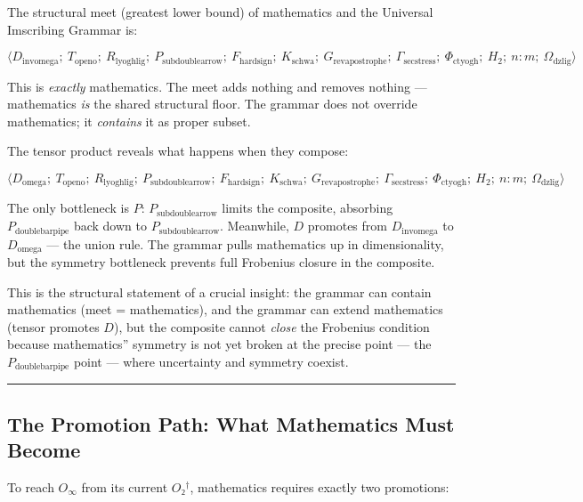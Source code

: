 \documentclass[12pt,a4paper]{article}
\begin{document}
The structural meet (greatest lower bound) of mathematics and the Universal Imscribing Grammar is:

\[\langle D_{\text{invomega}};\ T_{\text{openo}};\ R_{\text{lyoghlig}};\ P_{\text{subdoublearrow}};\ F_{\text{hardsign}};\ K_{\text{schwa}};\ G_{\text{revapostrophe}};\ \Gamma_{\text{secstress}};\ \Phi_{\text{ctyogh}};\ H_2;\ n{:}m;\ \Omega_{\text{dzlig}} \rangle\]

This is \emph{exactly} mathematics. The meet adds nothing and removes nothing --- mathematics \emph{is} the shared structural floor. The grammar does not override mathematics; it \emph{contains} it as proper subset.

The tensor product reveals what happens when they compose:

\[\langle D_{\text{omega}};\ T_{\text{openo}};\ R_{\text{lyoghlig}};\ P_{\text{subdoublearrow}};\ F_{\text{hardsign}};\ K_{\text{schwa}};\ G_{\text{revapostrophe}};\ \Gamma_{\text{secstress}};\ \Phi_{\text{ctyogh}};\ H_2;\ n{:}m;\ \Omega_{\text{dzlig}} \rangle\]

The only bottleneck is $P$: $P_{\text{subdoublearrow}}$ limits the composite, absorbing $P_{\text{doublebarpipe}}$ back down to $P_{\text{subdoublearrow}}$. Meanwhile, $D$ promotes from $D_{\text{invomega}}$ to $D_{\text{omega}}$ --- the union rule. The grammar pulls mathematics up in dimensionality, but the symmetry bottleneck prevents full Frobenius closure in the composite.

This is the structural statement of a crucial insight: the grammar can contain mathematics (meet = mathematics), and the grammar can extend mathematics (tensor promotes $D$), but the composite cannot \emph{close} the Frobenius condition because mathematics'' symmetry is not yet broken at the precise point --- the $P_{\text{doublebarpipe}}$ point --- where uncertainty and symmetry coexist.

\begin{center}
\rule{0.5\textwidth}{0.4pt}
\end{center}

\subsection{The Promotion Path: What Mathematics Must Become}

To reach $O_{\infty}$ from its current $O₂^\dagger$, mathematics requires exactly two promotions:
\end{document}
